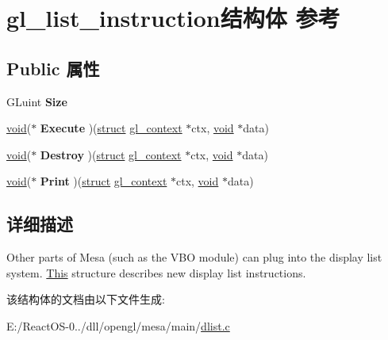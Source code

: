 \hypertarget{structgl__list__instruction}{}\section{gl\+\_\+list\+\_\+instruction结构体 参考}
\label{structgl__list__instruction}
\subsection*{Public 属性}
\begin{DoxyCompactItemize}
\item 
\mbox{\label{structgl__list__instruction_aa2d8379600083ec440550ac10e6bd218}} 
G\+Luint {\bfseries Size}
\item 
\mbox{\label{structgl__list__instruction_a5f5955df4a8788645b70c42d1ec6ee3f}} 
\hyperlink{interfacevoid}{void}($\ast$ {\bfseries Execute} )(\hyperlink{interfacestruct}{struct} \hyperlink{structgl__context}{gl\+\_\+context} $\ast$ctx, \hyperlink{interfacevoid}{void} $\ast$data)
\item 
\mbox{\label{structgl__list__instruction_a8379cc0f71be66eaccdfbab0ce26e99a}} 
\hyperlink{interfacevoid}{void}($\ast$ {\bfseries Destroy} )(\hyperlink{interfacestruct}{struct} \hyperlink{structgl__context}{gl\+\_\+context} $\ast$ctx, \hyperlink{interfacevoid}{void} $\ast$data)
\item 
\mbox{\label{structgl__list__instruction_af46eb57695b416dbaff94d3921503789}} 
\hyperlink{interfacevoid}{void}($\ast$ {\bfseries Print} )(\hyperlink{interfacestruct}{struct} \hyperlink{structgl__context}{gl\+\_\+context} $\ast$ctx, \hyperlink{interfacevoid}{void} $\ast$data)
\end{DoxyCompactItemize}


\subsection{详细描述}
Other parts of Mesa (such as the V\+BO module) can plug into the display list system. \hyperlink{namespace_this}{This} structure describes new display list instructions. 

该结构体的文档由以下文件生成\+:\begin{DoxyCompactItemize}
\item 
E\+:/\+React\+O\+S-\/0../dll/opengl/mesa/main/\hyperlink{dlist_8c}{dlist.\+c}\end{DoxyCompactItemize}
